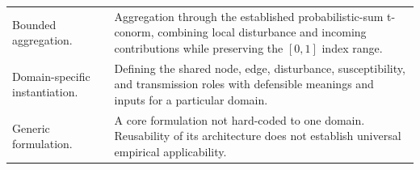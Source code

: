 {\begin{longtable}{@{}p{}p{}@{}}
Bounded aggregation. &
Aggregation through the established probabilistic-sum t-conorm, combining local disturbance and incoming contributions while preserving the $[0,1]$ index range. \\
\addlinespace
 
Domain-specific instantiation. &
Defining the shared node, edge, disturbance, susceptibility, and transmission roles with defensible meanings and inputs for a particular domain. \\
\addlinespace
 
Generic formulation. &
A core formulation not hard-coded to one domain. Reusability of its architecture does not establish universal empirical applicability. \\
 
\end{longtable}
}
